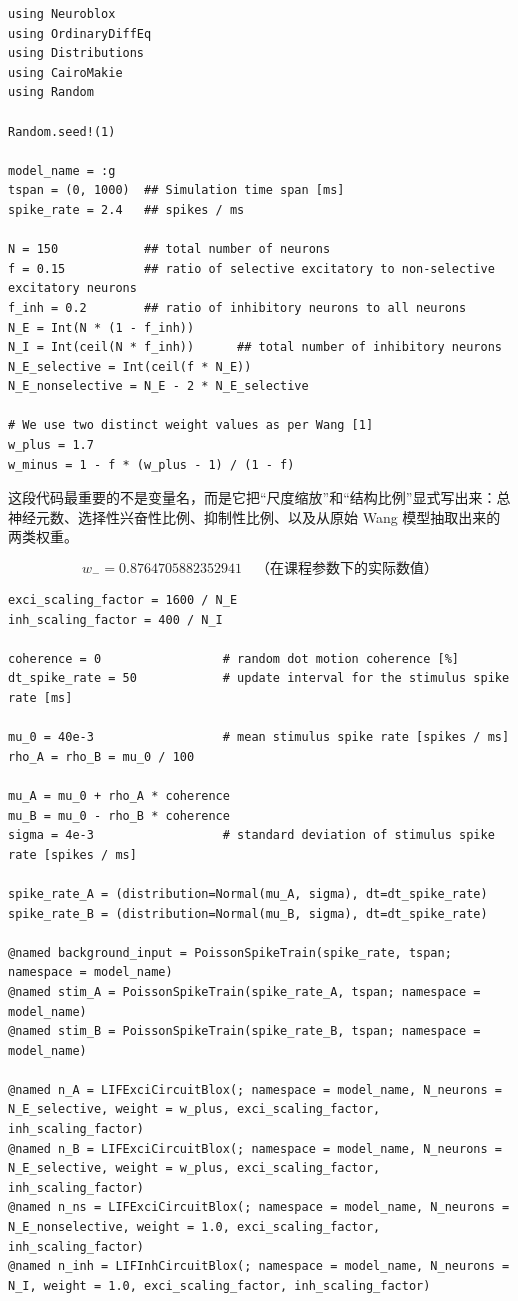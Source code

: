 \documentclass[a4paper]{article}
\begin{document}
\begin{lstlisting}[caption={模型参数、随机种子与输入对象},label={lst:dm_params}]
using Neuroblox
using OrdinaryDiffEq
using Distributions
using CairoMakie
using Random

Random.seed!(1)

model_name = :g
tspan = (0, 1000)  ## Simulation time span [ms]
spike_rate = 2.4   ## spikes / ms

N = 150            ## total number of neurons
f = 0.15           ## ratio of selective excitatory to non-selective excitatory neurons
f_inh = 0.2        ## ratio of inhibitory neurons to all neurons
N_E = Int(N * (1 - f_inh))
N_I = Int(ceil(N * f_inh))      ## total number of inhibitory neurons
N_E_selective = Int(ceil(f * N_E))
N_E_nonselective = N_E - 2 * N_E_selective

# We use two distinct weight values as per Wang [1]
w_plus = 1.7
w_minus = 1 - f * (w_plus - 1) / (1 - f)
\end{lstlisting}

这段代码最重要的不是变量名，而是它把“尺度缩放”和“结构比例”显式写出来：总神经元数、选择性兴奋性比例、抑制性比例、以及从原始 Wang 模型抽取出来的两类权重。

\begin{equation}
w_- = 0.8764705882352941 \quad \text{（在课程参数下的实际数值）}
\end{equation}

\begin{lstlisting}[caption={缩放因子、随机 dot coherence 与神经元块},label={lst:dm_blocks}]
exci_scaling_factor = 1600 / N_E
inh_scaling_factor = 400 / N_I

coherence = 0                 # random dot motion coherence [%]
dt_spike_rate = 50            # update interval for the stimulus spike rate [ms]

mu_0 = 40e-3                  # mean stimulus spike rate [spikes / ms]
rho_A = rho_B = mu_0 / 100

mu_A = mu_0 + rho_A * coherence
mu_B = mu_0 - rho_B * coherence
sigma = 4e-3                  # standard deviation of stimulus spike rate [spikes / ms]

spike_rate_A = (distribution=Normal(mu_A, sigma), dt=dt_spike_rate)
spike_rate_B = (distribution=Normal(mu_B, sigma), dt=dt_spike_rate)

@named background_input = PoissonSpikeTrain(spike_rate, tspan; namespace = model_name)
@named stim_A = PoissonSpikeTrain(spike_rate_A, tspan; namespace = model_name)
@named stim_B = PoissonSpikeTrain(spike_rate_B, tspan; namespace = model_name)

@named n_A = LIFExciCircuitBlox(; namespace = model_name, N_neurons = N_E_selective, weight = w_plus, exci_scaling_factor, inh_scaling_factor)
@named n_B = LIFExciCircuitBlox(; namespace = model_name, N_neurons = N_E_selective, weight = w_plus, exci_scaling_factor, inh_scaling_factor)
@named n_ns = LIFExciCircuitBlox(; namespace = model_name, N_neurons = N_E_nonselective, weight = 1.0, exci_scaling_factor, inh_scaling_factor)
@named n_inh = LIFInhCircuitBlox(; namespace = model_name, N_neurons = N_I, weight = 1.0, exci_scaling_factor, inh_scaling_factor)
\end{lstlisting}
\end{document}
